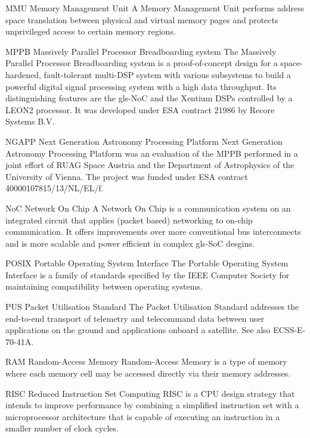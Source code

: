 %
  {MMU}%
  {Memory Management Unit}%
  {A Memory Management Unit performs address space translation between physical
   and virtual memory pages and protects unprivileged access to certain memory
   regions.}%

%
  {MPPB}%
  {Massively Parallel Processor Breadboarding system}%
  {The Massively Parallel Processor Breadboarding system is a proof-of-concept %
   design for a space-hardened, fault-tolerant multi-DSP system with various %
   subsystems to build a powerful digital signal processing system with a high %
   data throughput. Its distinguishing features are the \gls{gls-NoC} and the
   \gls{Xentium} \glspl{DSP} controlled by a \gls{LEON2} processor.
   It was developed under ESA contract 21986 by Recore Systems B.V.}%

%
  {NGAPP}%
  {Next Generation Astronomy Processing Platform}%
  {Next Generation Astronomy Processing Platform was an evaluation of the
   \gls{MPPB} performed in a joint effort of RUAG Space Austria and the
   Department of Astrophysics of the University of Vienna.
   The project was funded under ESA contract 40000107815/13/NL/EL/f.}%

%
  {NoC}%
  {Network On Chip}%
  {A Network On Chip is a communication system on an integrated circuit that
   applies (packet based) networking to on-chip communication. It offers
   improvements over more conventional bus interconnects and is more scalable
   and power efficient in complex \gls{gls-SoC} desgins.}%

  {POSIX}
  {Portable Operating System Interface}
  {The Portable Operating System Interface is a family of standards specified
   by the IEEE Computer Society for maintaining compatibility between
   operating systems.}%

  {PUS}
  {Packet Utilisation Standard}
  {The Packet Utilisation Standard addresses the end-to-end transport of telemetry
   and telecommand data between user applications on the ground and applications
   onboard a satellite. See also ECSS-E-70-41A.}%

%
  {RAM}%
  {Random-Access Memory}%
  {Random-Access Memory is a type of memory where each memory cell may be
   accessed directly via their memory addresses.}%

%
  {RISC}%
  {Reduced Instruction Set Computing}%
  {RISC is a \gls{CPU} design strategy that intends to improve performance by
   combining a simplified instruction set with a microprocessor architecture
   that is capable of executing an instruction in a smaller number of clock
   cycles.}%

